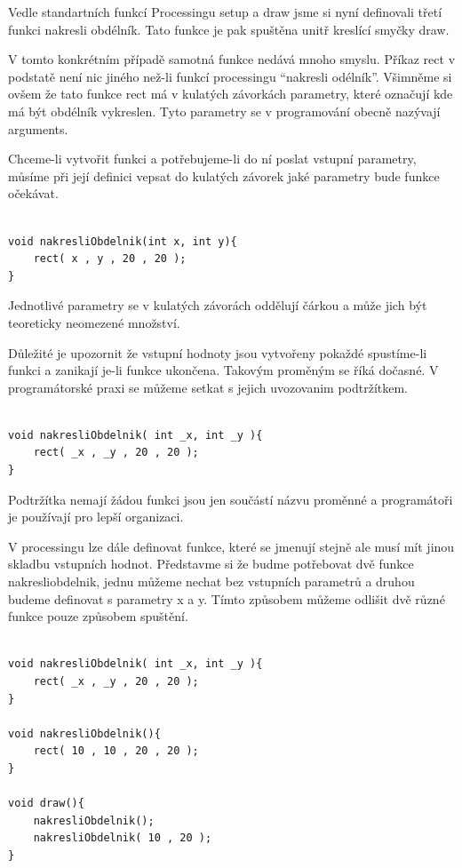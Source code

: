 \documentclass[10pt]{book}
\begin{document}
Vedle standartních funkcí Processingu setup a draw jsme si nyní definovali třetí funkci nakresli obdélník. Tato funkce je pak spuštěna unitř kreslící smyčky draw.

V tomto konkrétním případě samotná funkce nedává mnoho smyslu. Příkaz rect v podstatě není nic jiného než-li funkcí processingu “nakresli odélník”. Všimněme si ovšem že tato funkce rect má v kulatých závorkách parametry, které označují kde má být obdélník vykreslen. Tyto parametry se v programování obecně nazývají arguments.

Chceme-li vytvořit funkci a potřebujeme-li do ní poslat vstupní parametry, můsíme při její definici vepsat do kulatých závorek jaké parametry bude funkce očekávat.


\begin{lstlisting}

void nakresliObdelnik(int x, int y){
	rect( x , y , 20 , 20 );
}

\end{lstlisting}

Jednotlivé parametry se v kulatých závorách oddělují čárkou a může jich být teoreticky neomezené množství.

Důležité je upozornit že vstupní hodnoty jsou vytvořeny pokaždé spustíme-li funkci a zanikají je-li funkce ukončena. Takovým proměným se říká dočasné. V programátorské praxi se můžeme setkat s jejich uvozovanim podtržítkem.


\begin{lstlisting}

void nakresliObdelnik( int _x, int _y ){
	rect( _x , _y , 20 , 20 );
}

\end{lstlisting}

Podtržítka nemají žádou funkci jsou jen součástí názvu proměnné a programátoři je používají pro lepší organizaci.

V processingu lze dále definovat funkce, které se jmenují stejně ale musí mít jinou skladbu vstupních hodnot. Představme si že budme potřebovat dvě funkce nakresliobdelnik, jednu můžeme nechat bez vstupních parametrů a druhou budeme definovat s parametry x a y. Tímto způsobem můžeme odlišit dvě různé funkce pouze způsobem spuštění.


\begin{lstlisting}

void nakresliObdelnik( int _x, int _y ){
	rect( _x , _y , 20 , 20 );
}

void nakresliObdelnik(){
	rect( 10 , 10 , 20 , 20 );
}

void draw(){
	nakresliObdelnik();
	nakresliObdelnik( 10 , 20 );
}

\end{lstlisting}
\end{document}
